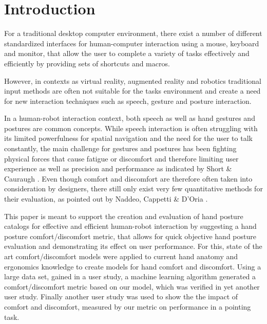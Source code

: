 \documentclass{sig-alternate-05-2015}
\begin{document}





%
%

%
%
\printccsdesc



\section{Introduction}

For a traditional desktop computer environment, there exist a number of different standardized interfaces for human-computer interaction using a mouse, keyboard and monitor, that allow the user to 
complete a variety of tasks effectively and efficiently by providing sets of shortcuts and macros. 

However, in contexts as virtual reality, augmented reality and robotics traditional input methods are often not suitable for the tasks environment and create a need for new interaction techniques such as speech, gesture and posture interaction. 

In a human-robot interaction context, both speech as well as hand gestures and postures are common concepts. While speech interaction is often struggling with its limited powerfulness for spatial navigation and the need for the user to talk constantly, the main challenge for gestures and postures has been fighting physical forces that cause fatigue or discomfort and therefore limiting user experience as well as precision and performance as indicated by Short \& Cauraugh \cite{short1999precision}. Even though comfort and discomfort are therefore often taken into consideration by designers, there still only exist very few quantitative methods for their evaluation, as pointed out by Naddeo, Cappetti \& D'Oria 
\cite{naddeo2015proposal}.

This paper is meant to support the creation and evaluation of hand posture catalogs for effective and efficient human-robot interaction by suggesting a hand posture comfort/discomfort metric, that allows for quick objective hand posture evaluation and demonstrating its effect on user performance. For this, state of the art comfort/discomfort models were applied to current hand anatomy and ergonomics knowledge to create models for hand comfort and discomfort. Using a large data set, gained in a user study, a machine learning algorithm generated a comfort/discomfort metric based on our model, which was verified in yet another user study. Finally another user study was used to show the the impact of comfort and discomfort, measured by our metric on performance in a pointing task.
\end{document}
